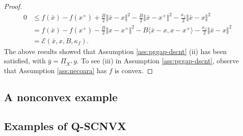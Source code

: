 \documentclass[12pt]{article}
\begin{document}
\begin{proof}
\begin{align*}
                0 &\le
                f(\bar x) - f(x^+) 
                + \frac{B}{2}\Vert \bar x - x\Vert^2 
                - \frac{B}{2}\Vert \bar x - x^+\Vert^2
                - \frac{\kappa_f}{2}\Vert \bar x - x\Vert^2
                \\
                &= 
                f(\bar x) - f(x^+) 
                - \frac{B}{2}\Vert x - x^+\Vert^2 
                - B\langle \bar x - x, x - x^+\rangle
                - \frac{\kappa_f}{2}\Vert \bar x - x\Vert^2
                \\
                &= \mathcal E(\bar x, x, B, \kappa_f). 
            \end{align*}
            The above results showed that Assumption \ref{ass:pggap-dscnt} (ii) has been satisfied, with $\bar y = \Pi_{X^+}y$. 
            To see (iii) in Assumption \ref{ass:pggap-dscnt}, observe that Assumption \ref{ass:necoara} has $f$ is convex. 
        \end{proof}
    
    \subsection{A nonconvex example}

    \subsection{Examples of Q-SCNVX}






\end{document}
